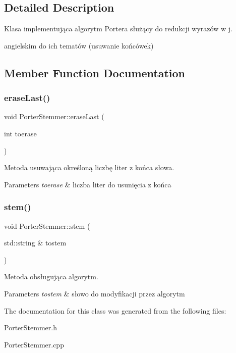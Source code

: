 \subsection{Detailed Description}
Klasa implementująca algorytm Portera służący do redukcji wyrazów w j. 

angielskim do ich tematów (usuwanie końcówek) 

\subsection{Member Function Documentation}
\mbox{\label{class_porter_stemmer_afca7fe9d292c46afac56ecd8e18d59f4}} 
\subsubsection{\texorpdfstring{eraseLast()}{eraseLast()}}
{\footnotesize\ttfamily void Porter\+Stemmer\+::erase\+Last (\begin{DoxyParamCaption}\item[{int}]{toerase }\end{DoxyParamCaption})\hspace{0.3cm}{\ttfamily [private]}}



Metoda usuwająca określoną liczbę liter z końca słowa. 


\begin{DoxyParams}{Parameters}
{\em toerase} & liczba liter do usunięcia z końca \\
\hline
\end{DoxyParams}
\mbox{\label{class_porter_stemmer_a2bbf1c12f88524ebfed18836dd09b0cc}} 
\subsubsection{\texorpdfstring{stem()}{stem()}}
{\footnotesize\ttfamily void Porter\+Stemmer\+::stem (\begin{DoxyParamCaption}\item[{std\+::string \&}]{tostem }\end{DoxyParamCaption})}



Metoda obsługująca algorytm. 


\begin{DoxyParams}{Parameters}
{\em tostem} & słowo do modyfikacji przez algorytm \\
\hline
\end{DoxyParams}


The documentation for this class was generated from the following files\+:\begin{DoxyCompactItemize}
\item 
Porter\+Stemmer.\+h\item 
Porter\+Stemmer.\+cpp\end{DoxyCompactItemize}
